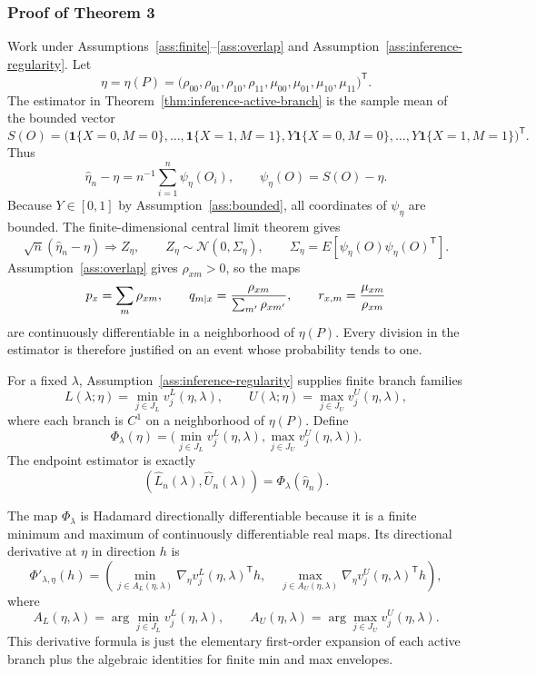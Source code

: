 \documentclass[11pt]{article}
\newcommand{\one}{\mathbf{1}}
\newcommand{\transpose}{\mathsf{T}}
\theoremstyle{definition}
\theoremstyle{plain}
\theoremstyle{remark}
\begin{document}
\subsubsection*{Proof of Theorem 3}
Work under Assumptions~\ref{ass:finite}--\ref{ass:overlap} and
Assumption~\ref{ass:inference-regularity}.  Let
\[
  \eta=\eta(P)=\bigl(\rho_{00},\rho_{01},\rho_{10},\rho_{11},
                    \mu_{00},\mu_{01},\mu_{10},\mu_{11}\bigr)^\transpose .
\]
The estimator in Theorem~\ref{thm:inference-active-branch} is the sample mean
of the bounded vector
\[
  S(O)=\bigl(\one\{X=0,M=0\},\ldots,\one\{X=1,M=1\},
             Y\one\{X=0,M=0\},\ldots,Y\one\{X=1,M=1\}\bigr)^\transpose .
\]
Thus
\[
  \widehat\eta_n-\eta=n^{-1}\sum_{i=1}^n\psi_\eta(O_i),
  \qquad
  \psi_\eta(O)=S(O)-\eta .
\]
Because \(Y\in[0,1]\) by Assumption~\ref{ass:bounded}, all coordinates of
\(\psi_\eta\) are bounded.  The finite-dimensional central limit theorem gives
\[
  \sqrt n(\widehat\eta_n-\eta)\Rightarrow Z_\eta,
  \qquad
  Z_\eta\sim\mathcal N(0,\Sigma_\eta),
  \qquad
  \Sigma_\eta=E[\psi_\eta(O)\psi_\eta(O)^\transpose].
\]
Assumption~\ref{ass:overlap} gives \(\rho_{xm}>0\), so the maps
\[
  p_x=\sum_m\rho_{xm},\qquad
  q_{m\mid x}={\rho_{xm}\over\sum_{m'}\rho_{xm'}},\qquad
  r_{x,m}={\mu_{xm}\over\rho_{xm}}
\]
are continuously differentiable in a neighborhood of \(\eta(P)\).  Every division in
the estimator is therefore justified on an event whose probability tends to one.

For a fixed \(\lambda\), Assumption~\ref{ass:inference-regularity} supplies finite
branch families
\[
  L(\lambda;\eta)=\min_{j\in J_L}v^L_j(\eta,\lambda),
  \qquad
  U(\lambda;\eta)=\max_{j\in J_U}v^U_j(\eta,\lambda),
\]
where each branch is \(C^1\) on a neighborhood of \(\eta(P)\).  Define
\[
  \Phi_\lambda(\eta)
  =
  \bigl(\min_{j\in J_L}v^L_j(\eta,\lambda),
        \max_{j\in J_U}v^U_j(\eta,\lambda)\bigr).
\]
The endpoint estimator is exactly
\[
  (\widehat L_n(\lambda),\widehat U_n(\lambda))
  =\Phi_\lambda(\widehat\eta_n).
\]

The map \(\Phi_\lambda\) is Hadamard directionally differentiable because it is a
finite minimum and maximum of continuously differentiable real maps.  Its directional
derivative at \(\eta\) in direction \(h\) is
\[
  \Phi'_{\lambda,\eta}(h)
  =
  \left(
    \min_{j\in A_L(\eta,\lambda)}
      \nabla_\eta v^L_j(\eta,\lambda)^\transpose h,\quad
    \max_{j\in A_U(\eta,\lambda)}
      \nabla_\eta v^U_j(\eta,\lambda)^\transpose h
  \right),
\]
where
\[
  A_L(\eta,\lambda)=\arg\min_{j\in J_L}v^L_j(\eta,\lambda),
  \qquad
  A_U(\eta,\lambda)=\arg\max_{j\in J_U}v^U_j(\eta,\lambda).
\]
This derivative formula is just the elementary first-order expansion of each active
branch plus the algebraic identities for finite min and max envelopes.
\end{document}

